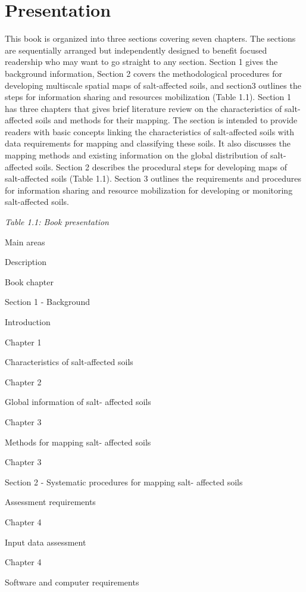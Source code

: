 \documentclass[
  10pt,
  b5paper,
]{book}
\begin{document}
\hypertarget{presentation}{%
\section{Presentation}\label{presentation}}

This book is organized into three sections covering seven chapters. The sections are sequentially arranged but independently designed to benefit focused readership who may want to go straight to any section. Section 1 gives the background information, Section 2 covers the methodological procedures for developing multiscale spatial maps of salt-affected soils, and section3 outlines the steps for information sharing and resources mobilization (Table 1.1). Section 1 has three chapters that gives brief literature review on the characteristics of salt-affected soils and methods for their mapping. The section is intended to provide readers with basic concepts linking the characteristics of salt-affected soils with data requirements for mapping and classifying these soils. It also discusses the mapping methods and existing information on the global distribution of salt-affected soils. Section 2 describes the procedural steps for developing maps of salt-affected soils (Table 1.1). Section 3 outlines the requirements and procedures for information sharing and resource mobilization for developing or monitoring salt-affected soils.

\emph{Table 1.1: Book presentation}

Main areas

Description

Book chapter

Section 1 - Background

Introduction

Chapter 1

Characteristics of salt-affected soils

Chapter 2

Global information of salt- affected soils

Chapter 3

Methods for mapping salt- affected soils

Chapter 3

Section 2 - Systematic procedures for mapping salt- affected soils

Assessment requirements

Chapter 4

Input data assessment

Chapter 4

Software and computer requirements
\end{document}
